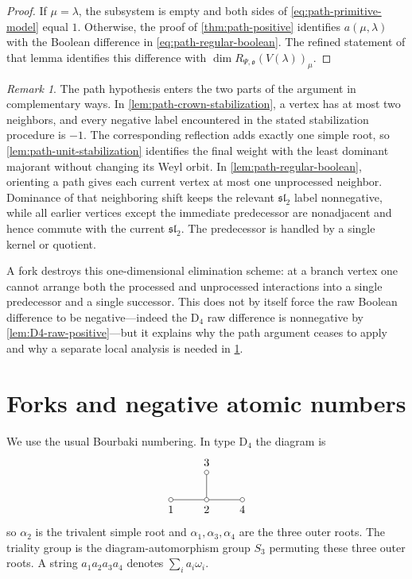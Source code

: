 \documentclass[11pt]{article}
\theoremstyle{definition}
\theoremstyle{remark}
\newtheorem{remark}[remark]{Remark}
\newcommand{\typeD}{\ensuremath{\mathrm{D}}}
\begin{document}
\begin{proof}
If $\mu=\lambda$, the subsystem is empty and both sides of
\eqref{eq:path-primitive-model} equal $1$.  Otherwise, the proof of
\cref{thm:path-positive} identifies $a(\mu,\lambda)$ with the
Boolean difference in \eqref{eq:path-regular-boolean}.  The refined statement
of that lemma identifies this difference with
$\dim R_{\Psi,\mathfrak o}(V(\lambda))_\mu$.
\end{proof}

\begin{remark}\label{rem:path-threshold}
The path hypothesis enters the two parts of the argument in complementary
ways.  In \cref{lem:path-crown-stabilization}, a vertex has at most two
neighbors, and every negative label encountered in the stated stabilization
procedure is $-1$.  The corresponding reflection adds exactly one simple
root, so \cref{lem:path-unit-stabilization} identifies the final weight with
the least dominant majorant without changing its Weyl orbit.
In \cref{lem:path-regular-boolean}, orienting a
path gives each current vertex at most one unprocessed neighbor.  Dominance of
that neighboring shift keeps the relevant $\mathfrak{sl}_2$ label
nonnegative, while all earlier vertices except the immediate predecessor are
nonadjacent and hence commute with the current $\mathfrak{sl}_2$.  The
predecessor is handled by a single kernel or quotient.

A fork destroys this one-dimensional elimination scheme: at a branch vertex
one cannot arrange both the processed and unprocessed interactions into a
single predecessor and a single successor.  This does not by itself force the
raw Boolean difference to be negative---indeed the $\typeD_4$ raw difference
is nonnegative by \cref{lem:D4-raw-positive}---but it explains why the path
argument ceases to apply and why a separate local analysis is needed in
\cref{sec:D4}.
\end{remark}


\section{Forks and negative atomic numbers}\label{sec:D4}\label{sec:DE-obstruction}

We use the usual Bourbaki numbering.  In type $\typeD_4$ the diagram is
\[
\begin{tikzpicture}[baseline=-.4ex,scale=.75]
  \node[circle,draw,inner sep=1.4pt,label=below:$1$] (a1) at (0,0) {};
  \node[circle,draw,inner sep=1.4pt,label=below:$2$] (a2) at (1.5,0) {};
  \node[circle,draw,inner sep=1.4pt,label=above:$3$] (a3) at (1.5,1.15) {};
  \node[circle,draw,inner sep=1.4pt,label=below:$4$] (a4) at (3,0) {};
  \draw (a1)--(a2)--(a4);
  \draw (a2)--(a3);
\end{tikzpicture}
\]
so $\alpha_2$ is the trivalent simple root and
$\alpha_1,\alpha_3,\alpha_4$ are the three outer roots.  The triality group is
the diagram-automorphism group $S_3$ permuting these three outer roots.  A
string $a_1a_2a_3a_4$ denotes $\sum_i a_i\omega_i$.
\end{document}
